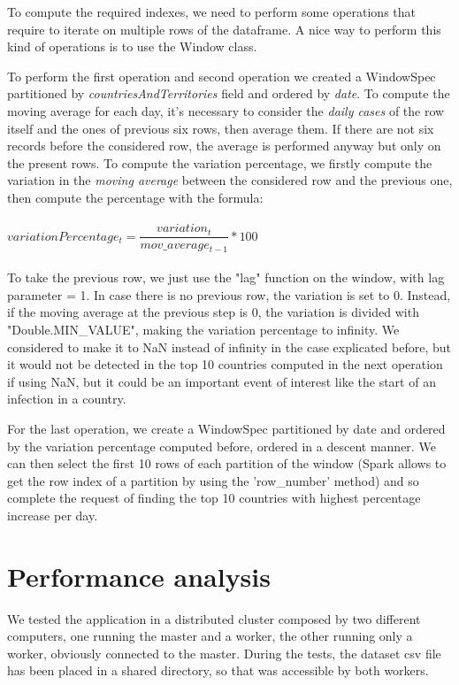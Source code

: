 \documentclass[10pt]{article}
\begin{document}
	To compute the required indexes, we need to perform some operations that require to iterate on multiple rows of the dataframe. A nice way to perform this kind of operations is to use the Window class.
	
	To perform the first operation and second operation we created a WindowSpec partitioned by \textit{countriesAndTerritories} field and ordered by \textit{date}. To compute the moving average for each day, it's necessary to consider the \textit{daily cases} of the row itself and the ones of previous six rows, then average them. If there are not six records before the considered row, the average is performed anyway but only on the present rows.
	To compute the variation percentage, we firstly compute the variation in the \textit{moving average} between the considered row and the previous one, then compute the percentage with the formula:\\\\
	$ variationPercentage_{t} = \dfrac{variation_{t}}{mov\_average_{t-1}} * 100$\\\\
	To take the previous row, we just use the "lag" function on the window, with lag parameter = 1. In case there is no previous row, the variation is set to 0. Instead, if the moving average at the previous step is 0, the variation is divided with "Double.MIN\_VALUE", making the variation percentage to infinity. We considered to make it to NaN instead of infinity in the case explicated before, but it would not be detected in the top 10 countries computed in the next operation if using NaN, but it could be an important event of interest like the start of an infection in a country.
	
	For the last operation, we create a WindowSpec partitioned by date and ordered by the variation percentage computed before, ordered in a descent manner. We can then select the first 10 rows of each partition of the window (Spark allows to get the row index of a partition by using the 'row\_number' method) and so complete the request of finding the top 10 countries with highest percentage increase per day.
	
	\section{Performance analysis}
    We tested the application in a distributed cluster composed by two different computers, one running the master and a worker, the other running only a worker, obviously connected to the master. During the tests, the dataset csv file has been placed in a shared directory, so that was accessible by both workers.
    
\end{document}
